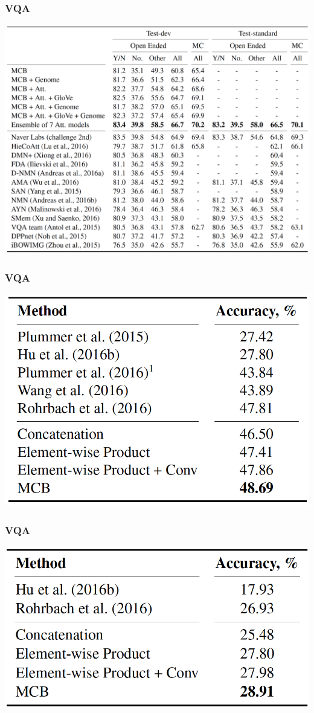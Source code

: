 \documentclass{beamer}
\begin{document}
\begin{frame}
\frametitle{VQA}
\begin{center}
\includegraphics[scale=0.3]{./images/VQA_Result03}
\end{center}
\end{frame}
\begin{frame}
\frametitle{VQA}
\begin{center}
\includegraphics[scale=0.5]{./images/VQA_Result04}
\end{center}
\end{frame}
\begin{frame}
\frametitle{VQA}
\begin{center}
\includegraphics[scale=0.5]{./images/VQA_Result05}
\end{center}
\end{frame}
\end{document}
